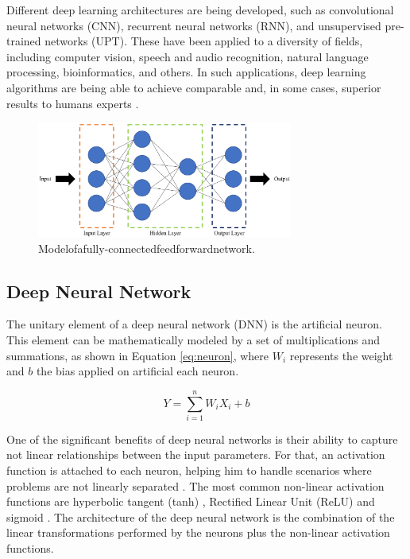 Different deep learning architectures are being developed, such as convolutional neural networks (CNN), recurrent neural networks (RNN), and unsupervised pre-trained networks (UPT). These have been applied to a diversity of fields, including computer vision, speech and audio recognition, natural language processing, bioinformatics, and others. In such applications, deep learning algorithms are being able to achieve comparable and, in some cases, superior results to humans experts \cite{noauthor_googles_nodate}.

\begin{figure}[!htb]
  \centering
  \includegraphics[width=0.75\textwidth]{Figures/DL/DNNarch.png}
  \caption[]{ Modelofafully-connectedfeedforwardnetwork.}
  \label{fig:DNNarch}
\end{figure}


\subsection{Deep Neural Network}
The unitary element of a deep neural network (DNN) is the artificial neuron. This element can be mathematically modeled by a set of multiplications and summations, as shown in Equation \ref{eq:neuron}, where $W_i$ represents the weight and $b$ the bias applied on artificial each neuron.

\begin{equation}
\label{eq:neuron}
    Y = \sum_{i=1}^{n} W_iX_i+b
\end{equation}

One of the significant benefits of deep neural networks is their ability to capture not linear relationships between the input parameters. For that, an activation function is attached to each neuron, helping him to handle scenarios where problems are not linearly separated \cite{dong_dnnmark:_2017}. The most common non-linear activation functions are  hyperbolic tangent (tanh) \cite{orr_neural_1998}, Rectified Linear Unit (ReLU) \cite{orr_neural_1998} and sigmoid \cite{orr_neural_1998}. The architecture of the deep neural network is the combination of the linear transformations performed by the neurons plus the non-linear activation functions.

